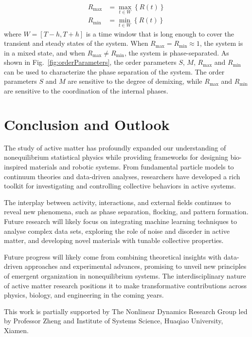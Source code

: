 \documentclass[a4paper, amsfonts, amssymb, amsmath, reprint, showkeys, showpacs, nofootinbib, twoside]{revtex4-2}
\begin{document}
\begin{subequations}
    \begin{align}
        R_{\max}&=\max_{t\in W} \left\{ R\left( t \right) \right\} 
        \\
        R_{\min}&=\min_{t\in W} \left\{ R\left( t \right) \right\} 
    \end{align}
\end{subequations}
where $W=\left[ T-h,T+h \right]$ is a time window that is long enough to cover the transient and steady states of the system. When $R_{\max}=R_{\min}\approx1$, the system is in a mixed state, and when $R_{\max}\neq R_{\min}$, the system is phase-separated. As shown in Fig.~\ref{fig:orderParameters}, the order parameters $S$, $M$, $R_{\max}$ and $R_{\min}$ can be used to characterize the phase separation of the system. The order parameters $S$ and $M$ are sensitive to the degree of demixing, while $R_{\max}$ and $R_{\min}$ are sensitive to the coordination of the internal phases.

\section{\label{sec:Conclusion} Conclusion and Outlook}

The study of active matter has profoundly expanded our understanding of nonequilibrium statistical physics while providing frameworks for designing bio-inspired materials and robotic systems. From fundamental particle models to continuum theories and data-driven analyses, researchers have developed a rich toolkit for investigating and controlling collective behaviors in active systems.

The interplay between activity, interactions, and external fields continues to reveal new phenomena, such as phase separation, flocking, and pattern formation. Future research will likely focus on integrating machine learning techniques to analyse complex data sets, exploring the role of noise and disorder in active matter, and developing novel materials with tunable collective properties.

Future progress will likely come from combining theoretical insights with data-driven approaches and experimental advances, promising to unveil new principles of emergent organization in nonequilibrium systems. The interdisciplinary nature of active matter research positions it to make transformative contributions across physics, biology, and engineering in the coming years. 

\begin{acknowledgments}
This work is partially supported by The Nonlinear Dynamics Research Group led by Professor Zheng and Institute of Systems Science, Huaqiao University, Xiamen.
\end{acknowledgments}


\end{document}
